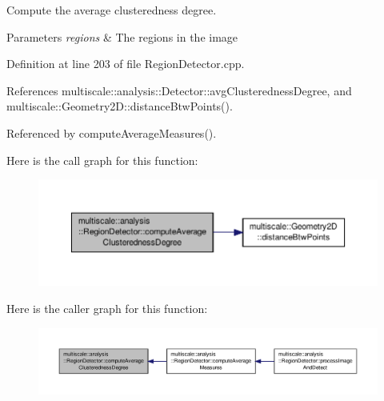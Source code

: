 Compute the average clusteredness degree. 


\begin{DoxyParams}{Parameters}
{\em regions} & The regions in the image \\
\hline
\end{DoxyParams}


Definition at line 203 of file Region\-Detector.\-cpp.



References multiscale\-::analysis\-::\-Detector\-::avg\-Clusteredness\-Degree, and multiscale\-::\-Geometry2\-D\-::distance\-Btw\-Points().



Referenced by compute\-Average\-Measures().



Here is the call graph for this function\-:
\nopagebreak
\begin{figure}[H]
\begin{center}
\leavevmode
\includegraphics[width=350pt]{classmultiscale_1_1analysis_1_1RegionDetector_a5ad71a8af2beb1a02573d0c125af4e16_cgraph}
\end{center}
\end{figure}




Here is the caller graph for this function\-:
\nopagebreak
\begin{figure}[H]
\begin{center}
\leavevmode
\includegraphics[width=350pt]{classmultiscale_1_1analysis_1_1RegionDetector_a5ad71a8af2beb1a02573d0c125af4e16_icgraph}
\end{center}
\end{figure}


